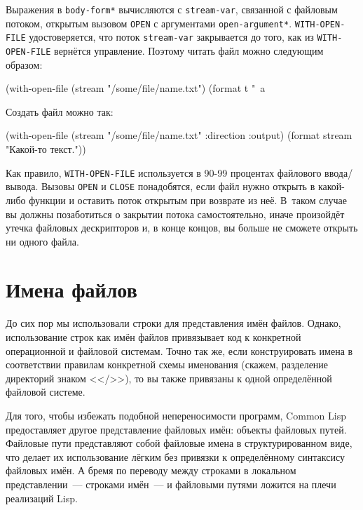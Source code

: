 Выражения в \lstinline{body-form*} вычисляются с \lstinline{stream-var}, связанной с файловым
потоком, открытым вызовом \lstinline{OPEN} с аргументами
\lstinline{open-argument*}. \lstinline{WITH-OPEN-FILE} удостоверяется, что поток \lstinline{stream-var}
закрывается до того, как из \lstinline{WITH-OPEN-FILE} вернётся управление. Поэтому читать файл
можно следующим образом:

\begin{myverb}
(with-open-file (stream "/some/file/name.txt") 
  (format t "~a~%
\end{myverb}

Создать файл можно так:

\begin{myverb}
(with-open-file (stream "/some/file/name.txt" :direction :output) 
  (format stream "Какой-то текст.")) 
\end{myverb}

Как правило, \lstinline{WITH-OPEN-FILE} используется в 90-99 процентах файлового
ввода/вывода. Вызовы \lstinline{OPEN} и \lstinline{CLOSE} понадобятся, если файл нужно открыть в
какой-либо функции и оставить поток открытым при возврате из неё. В~таком случае вы должны
позаботиться о закрытии потока самостоятельно, иначе произойдёт утечка файловых
дескрипторов и, в конце концов, вы больше не сможете открыть ни одного файла.

\section{Имена файлов}
\label{ch14:file-names}

До сих пор мы использовали строки для представления имён файлов. Однако, использование
строк как имён файлов привязывает код к конкретной операционной и файловой системам. Точно
так же, если конструировать имена в соответствии правилам конкретной схемы именования
(скажем, разделение директорий знаком <</>>), то вы также привязаны к одной определённой
файловой системе.

Для того, чтобы избежать подобной непереносимости программ, Common Lisp предоставляет
другое представление файловых имён: объекты файловых путей. Файловые пути представляют
собой файловые имена в структурированном виде, что делает их использование лёгким без
привязки к определённому синтаксису файловых имён. А бремя по переводу между строками в
локальном представлении~--- строками имён~--- и файловыми путями ложится на плечи реализаций
Lisp.

